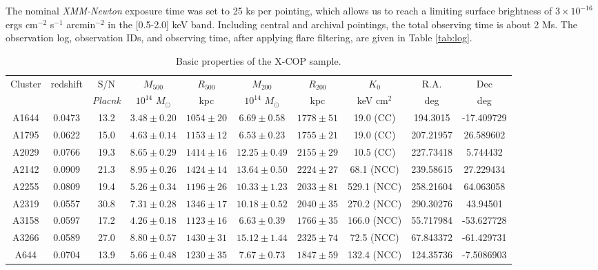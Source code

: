 \documentclass[traditabstract   ]{aa} %
\begin{document}
The nominal \emph{XMM-Newton} exposure time was set to 25 ks per pointing, which allows us to reach a limiting surface brightness of $3\times10^{-16}$ ergs cm$^{-2}$ s$^{-1}$ arcmin$^{-2}$ in the [0.5-2.0] keV band. Including central and archival pointings, the total observing time is about 2 Ms. The observation log, observation IDs, and observing time, after applying flare filtering, are given in Table \ref{tab:log}.
 
 
\begin{table}[t]
\caption{Basic properties of the X-COP sample.}
\begin{center}
\begin{tabular}{ c c c c c c c c c c}
\hline
Cluster & redshift & S/N & $M_{500}$ & $R_{500}$ & $M_{200}$ & $R_{200}$ & $K_0$ & R.A. & Dec \\
  &   & \emph{Placnk}  & $10^{14}$ $M_{\odot}$ & kpc & $10^{14}$ $M_{\odot}$ & kpc & keV cm$^2$  & deg & deg\\
\hline
       A1644 & 0.0473 & 13.2 & $3.48 \pm 0.20$ & $1054 \pm 20$ & $6.69 \pm 0.58$ & $1778 \pm 51$ & 19.0 (CC) & 194.3015 & -17.409729 \\
       A1795 & 0.0622 & 15.0 & $4.63 \pm 0.14$ & $1153 \pm 12$ & $6.53 \pm 0.23$ & $1755 \pm 21$ & 19.0 (CC) & 207.21957 & 26.589602 \\
       A2029 & 0.0766 & 19.3 & $8.65 \pm 0.29$ & $1414 \pm 16$ & $12.25 \pm 0.49$ & $2155 \pm 29$ & 10.5 (CC) & 227.73418 & 5.744432 \\
       A2142 & 0.0909 & 21.3 & $8.95 \pm 0.26$ & $1424 \pm 14$ & $13.64 \pm 0.50$ & $2224 \pm 27$ & 68.1 (NCC) & 239.58615 & 27.229434 \\
       A2255 & 0.0809 & 19.4 & $5.26 \pm 0.34$ & $1196 \pm 26$ & $10.33 \pm 1.23$ & $2033 \pm 81$ & 529.1 (NCC) & 258.21604 & 64.063058 \\
       A2319 & 0.0557 & 30.8 & $7.31 \pm 0.28$ & $1346 \pm 17$ & $10.18 \pm 0.52$ & $2040 \pm 35$ & 270.2 (NCC) & 290.30276 & 43.94501 \\
       A3158 & 0.0597 & 17.2 & $4.26 \pm 0.18$ & $1123 \pm 16$ & $6.63 \pm 0.39$ & $1766 \pm 35$ & 166.0 (NCC) & 55.717984 & -53.627728\\
       A3266 & 0.0589 & 27.0 & $8.80 \pm 0.57$ & $1430 \pm 31$ & $15.12 \pm 1.44$ & $2325 \pm 74$ & 72.5 (NCC) & 67.843372 & -61.429731 \\
        A644 & 0.0704 & 13.9 & $5.66 \pm 0.48$ & $1230 \pm 35$ & $7.67 \pm 0.73$ & $1847 \pm 59$ & 132.4 (NCC) & 124.35736 & -7.5086903 \\

\end{tabular}
\end{center}
\end{table}
\end{document}
